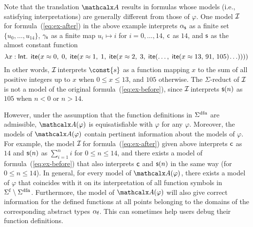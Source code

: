 \newcommand\badlambda{\lambda x : \typeint.\allowbreak\;\, \lite( x \teq 0,\allowbreak\; 0,\allowbreak\;
  \lite( x \teq 1,\allowbreak\; 1,\allowbreak\;
    \lite( x \teq 2,\allowbreak\; 3,\allowbreak\;
      \lite(\dotsc,\allowbreak\; \lite( x \teq 13,\allowbreak\, 91,\allowbreak\, 105 )\negvthinspace \ldots ))))}

Note that the translation $\conv$ results in formulas whose models
(i.e., satisfying interpretations) are generally different from those of $\varphi$.
One model $\mathcal{I\!}$ for formula~(\ref{eq:ex-after}) in the above example interprets
$\alpha_{\mathsf{s}}$ as a finite set $\{ u_0, \dotsc, u_{14} \}$,
$\gamma_{\mathsf{s}}$ as a finite map $u_i \mapsto i$ for $i = 0, \dotsc, 14$,
$\mathsf{c}$ as $14$,
and $\mathsf{s}$ as the almost constant function
%
\[\badlambda\]
%
In other words, $\mathcal{I\!}$ interprets $\const{s}$ as a function mapping $x$ to the sum
of all positive integers up to $x$ when $0 \leq x \leq 13$, and $105$
otherwise.
The $\Sigma$-reduct of $\mathcal{I\!}$ is not a model of the original formula~(\ref{eq:ex-before}),
since $\mathcal{I\!}$
interprets $\mathsf{s}( n )$ as $105$ when $n < 0$ or $n > 14$.

However, under the assumption that the function definitions in
$\sfundefs{\Sigma}$ are admissible, %
$\conv(\varphi)$ is equisatisfiable with $\varphi$ for any $\varphi$.
Moreover, the models of $\conv( \varphi )$ contain
pertinent information about the models of $\varphi$. For example, the model
$\mathcal{I\!}$ for formula~(\ref{eq:ex-after}) given above interprets $\mathsf{c}$ as $14$
and $\mathsf{s}(n)$ as $\sum_{i=1}^n i$ for $0 \le n \le 14$,
and there exists a model of formula~(\ref{eq:ex-before}) that also interprets
$\mathsf{c}$ and $\mathsf{s}(n)$ in the same way (for $0 \le n \le 14$).
In general, for every model of $\conv( \varphi )$,
there exists a model of $\varphi$ that
coincides with it on its interpretation of all
function symbols in $\sfuns{\Sigma} \setminus \sfundefs{\Sigma}$.
Furthermore, the model of $\conv( \varphi )$ will
also give correct information for the defined functions at all points belonging
to the domains of the corresponding abstract types $\alpha_{\mathsf{f}}$.
This can sometimes help users debug their
function definitions.

